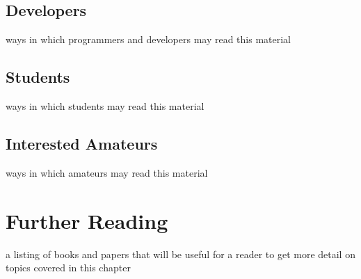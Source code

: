 \subsection{Developers}
ways in which programmers and developers may read this material

\subsection{Students}
ways in which students may read this material

\subsection{Interested Amateurs}
ways in which amateurs may read this material


% 
% 
\section{Further Reading}
\label{intro:sec:further_reading}

a listing of books and papers that will be useful for a reader to get more detail on topics covered in this chapter

